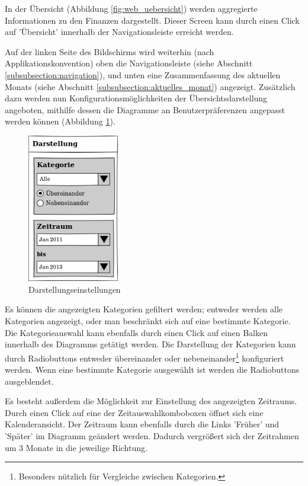 In der Übersicht (Abbildung \ref{fig:web_uebersicht}) werden aggregierte Informationen zu den Finanzen dargestellt.
Dieser Screen kann durch einen Click auf 'Übersicht' innerhalb der
Navigationsleiste erreicht werden.

Auf der linken Seite des Bildschirms wird weiterhin (nach
Applikationskonvention) oben die Navigationsleiste (siehe Abschnitt
\ref{subsubsection:navigation}), und unten eine Zusammenfassung des aktuellen
Monats (siehe Abschnitt \ref{subsubsection:aktuelles_monat}) angezeigt.
Zusätzlich dazu werden nun Konfigurationsmöglichkeiten der
Übersichtsdarstel\-lung angeboten, mithilfe dessen die Diagramme an
Benutzerpräferenzen angepasst werden können (Abbildung \ref{fig:web_display_settings}).

\begin{figure}[htl]
\centering
\includegraphics[width=4cm]{img/web_display_settings}
\caption{Darstellungseinstellungen}
\label{fig:web_display_settings}
\end{figure}

Es können die angezeigten Kategorien gefiltert werden; entweder werden alle
Kategorien angezeigt, oder man beschränkt sich auf eine bestimmte Kategorie.
Die Kategorieauswahl kann ebenfalls durch einen Click auf einen Balken
innerhalb des Diagramms getätigt werden. Die Darstellung der Kategorien kann
durch Radiobuttons entweder übereinander oder nebeneinander\footnote{Besonders
nützlich für Vergleiche zwischen Kategorien.} konfiguriert werden.  Wenn eine
bestimmte Kategorie ausgewählt ist werden die Radiobuttons ausgeblendet.

Es besteht außerdem die Möglichkeit zur Einstellung des angezeigten Zeitraums.
Durch einen Click auf eine der Zeitauswahlkomboboxen öffnet sich eine
Kalenderansicht. Der Zeitraum kann ebenfalls durch die Links 'Früher' und
'Später' im Diagramm geändert werden. Dadurch vergrößert sich der Zeitrahmen um
3 Monate in die jeweilige Richtung.

